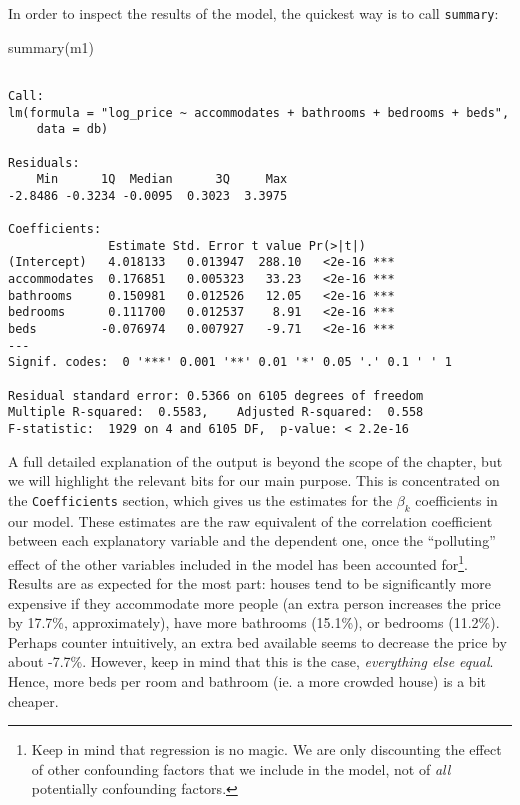 \documentclass[
  letterpaper,
  krantz2]{style/krantz}
\newenvironment{Shaded}{\begin{snugshade}}{\end{snugshade}}
\newcommand{\FunctionTok}[1]{\textcolor[rgb]{0.28,0.35,0.67}{#1}}
\newcommand{\NormalTok}[1]{\textcolor[rgb]{0.00,0.23,0.31}{#1}}
\begin{document}
In order to inspect the results of the model, the quickest way is to
call \texttt{summary}:

\begin{Shaded}
\begin{Highlighting}[]
\FunctionTok{summary}\NormalTok{(m1)}
\end{Highlighting}
\end{Shaded}

\begin{verbatim}

Call:
lm(formula = "log_price ~ accommodates + bathrooms + bedrooms + beds", 
    data = db)

Residuals:
    Min      1Q  Median      3Q     Max 
-2.8486 -0.3234 -0.0095  0.3023  3.3975 

Coefficients:
              Estimate Std. Error t value Pr(>|t|)    
(Intercept)   4.018133   0.013947  288.10   <2e-16 ***
accommodates  0.176851   0.005323   33.23   <2e-16 ***
bathrooms     0.150981   0.012526   12.05   <2e-16 ***
bedrooms      0.111700   0.012537    8.91   <2e-16 ***
beds         -0.076974   0.007927   -9.71   <2e-16 ***
---
Signif. codes:  0 '***' 0.001 '**' 0.01 '*' 0.05 '.' 0.1 ' ' 1

Residual standard error: 0.5366 on 6105 degrees of freedom
Multiple R-squared:  0.5583,    Adjusted R-squared:  0.558 
F-statistic:  1929 on 4 and 6105 DF,  p-value: < 2.2e-16
\end{verbatim}

A full detailed explanation of the output is beyond the scope of the
chapter, but we will highlight the relevant bits for our main purpose.
This is concentrated on the \texttt{Coefficients} section, which gives
us the estimates for the \(\beta_k\) coefficients in our model. These
estimates are the raw equivalent of the correlation coefficient between
each explanatory variable and the dependent one, once the ``polluting''
effect of the other variables included in the model has been accounted
for\footnote{Keep in mind that regression is no magic. We are only
  discounting the effect of other confounding factors that we include in
  the model, not of \emph{all} potentially confounding factors.}.
Results are as expected for the most part: houses tend to be
significantly more expensive if they accommodate more people (an extra
person increases the price by 17.7\%, approximately), have more
bathrooms (15.1\%), or bedrooms (11.2\%). Perhaps counter intuitively,
an extra bed available seems to decrease the price by about -7.7\%.
However, keep in mind that this is the case, \emph{everything else
equal}. Hence, more beds per room and bathroom (ie. a more crowded
house) is a bit cheaper.
\end{document}
